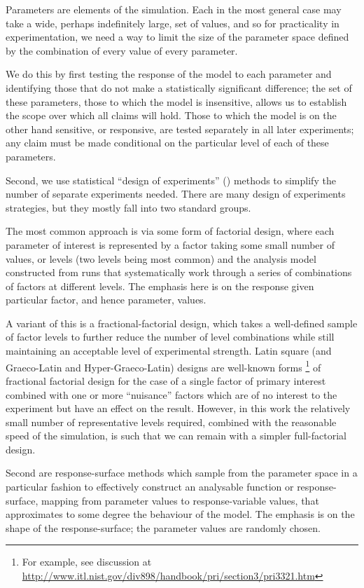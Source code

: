 Parameters are elements of the simulation. Each in the most general case may take a wide, perhaps indefinitely large, set of values, and so for practicality in experimentation, we need a way to limit the size of the parameter space defined by the combination of every value of every parameter. 

We do this by first testing the response of the model to each parameter and identifying those that do not make a statistically significant difference; the set of these parameters, those to which the model is insensitive, allows us to establish the scope over which all claims will hold. Those to which the model is on the other hand sensitive, or responsive, are tested separately in all later experiments; any claim must be made conditional on the particular level of each of these parameters.

Second, we use statistical ``design of experiments'' (\eg \cite{Montgomery2009}) methods to simplify the number of separate experiments needed. There are many design of experiments strategies, but they mostly fall into two standard groups. 

The most common approach is via some form of factorial design, where each parameter of interest is represented by a factor taking some small number of values, or levels (two levels being most common) and the analysis model constructed from runs that systematically work through a series of combinations of factors at different levels. The emphasis here is on the response given particular factor, and hence parameter, values. 

A variant of this is a fractional-factorial design, which takes a well-defined sample of factor levels to further reduce the number of level combinations while still maintaining an acceptable level of experimental strength. Latin square (and Graeco-Latin and Hyper-Graeco-Latin) designs are well-known forms \footnote{For example, see discussion at \url{http://www.itl.nist.gov/div898/handbook/pri/section3/pri3321.htm}} of fractional factorial design for the case of a single factor of primary interest combined with one or more ``nuisance'' factors which are of no interest to the experiment but have an effect on the result. However, in this work the relatively small number of representative levels required, combined with the reasonable speed of the simulation, is such that we can remain with a simpler full-factorial design.

Second are response-surface methods which sample from the parameter space in a particular fashion to effectively construct an analysable function or response-surface, mapping from parameter values to response-variable values, that approximates to some degree the behaviour of the model. The emphasis is on the shape of the response-surface; the parameter values are randomly chosen.


